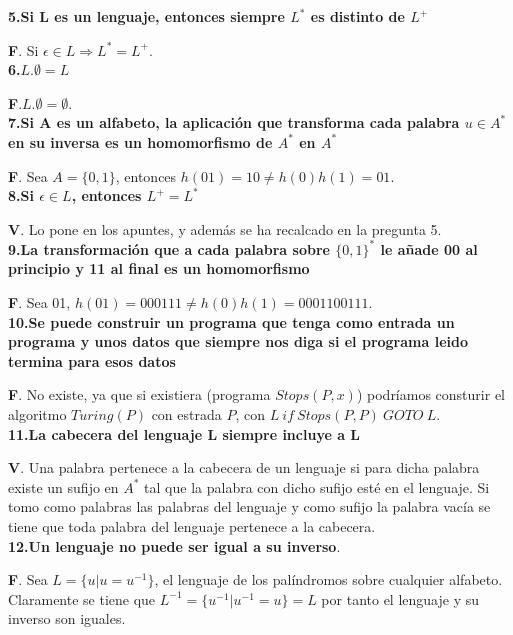 \documentclass[a4paper,11pt]{article}
\begin{document}
\textbf{5.Si L es un lenguaje, entonces siempre $L^*$ es distinto de $L^+$}

\textbf{F}. Si $\epsilon \in L \Rightarrow L^*=L^+$. \\

\textbf{6.$L.\emptyset=L$}

\textbf{F}.$L.\emptyset=\emptyset$. \\

\textbf{7.Si A es un alfabeto, la aplicación que transforma cada palabra $u\in A^*$ en su inversa es un homomorfismo de $A^*$ en $A^*$}

\textbf{F}. Sea $A=\{0,1\}$, entonces $h(01)=10\neq h(0)h(1)=01$. \\

\textbf{8.Si $\epsilon \in L$, entonces $L^+=L^*$}

\textbf{V}. Lo pone en los apuntes, y además se ha recalcado en la pregunta 5. \\

\textbf{9.La transformación que a cada palabra sobre $\{0,1\}^*$ le añade 00 al principio y 11 al final es un homomorfismo}

\textbf{F}. Sea 01, $h(01)=000111\neq h(0)h(1)=0001100111$. \\

\textbf{10.Se puede construir un programa que tenga como entrada un programa y unos datos que siempre nos diga si el programa leido termina para esos datos}

\textbf{F}. No existe, ya que si existiera (programa $Stops(P,x)$) podríamos consturir el algoritmo $Turing(P)$ con estrada $P$, con $L \> if \> Stops(P,P) \> GOTO \> L$. \\

\textbf{11.La cabecera del lenguaje L siempre incluye a L}

\textbf{V}. Una palabra pertenece a la cabecera de un lenguaje si para dicha palabra existe un sufijo en $A^*$ tal que la palabra con dicho sufijo esté en el lenguaje. Si tomo como palabras las palabras del lenguaje y como sufijo la palabra vacía se tiene que toda palabra del lenguaje pertenece a la cabecera. \\

\textbf{12.Un lenguaje no puede ser igual a su inverso}.

\textbf{F}. Sea $L=\{u|u=u^{-1}\}$, el lenguaje de los palíndromos sobre cualquier alfabeto. Claramente se tiene que $L^{-1}=\{u^{-1}|u^{-1}=u\}=L$ por tanto el lenguaje y su inverso son iguales. \\
\end{document}
